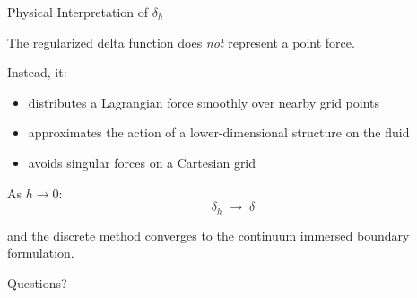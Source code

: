 \documentclass{beamer}
\begin{document}
\begin{frame}{Physical Interpretation of $\delta_h$}

The regularized delta function does \emph{not} represent a point force.

\medskip

Instead, it:
\begin{itemize}
    \item distributes a Lagrangian force smoothly over nearby grid points
    \item approximates the action of a lower-dimensional structure on the fluid
    \item avoids singular forces on a Cartesian grid
\end{itemize}

\medskip

As $h \rightarrow 0$:
\[
\delta_h \;\longrightarrow\; \delta
\]

and the discrete method converges to the continuum immersed boundary formulation.

\end{frame}

\begin{frame}
\centering
\Large Questions?
\end{frame}
\end{document}
